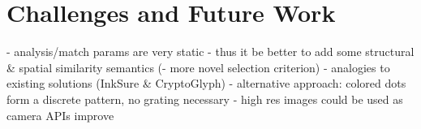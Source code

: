 \documentclass[thesis.tex]{subfiles}
\begin{document}
\section{Challenges and Future Work}
\begin{comment}

Ideally, the taggants would have been captured through a diffraction grating (or a prism). Translate to wavelengths through proper color calibration.

There are mainly two modules responsible for the color-rendering accuracy of a digital camera: the former is the illuminant estimation and correction module, and the latter is the color matrix transformation aimed to adapt the color response of the sensor to a standard color space. These two modules together form what may be called the color correction pipeline.

RGB is a device-dependent color model: different devices detect or reproduce a given RGB value differently, since the color elements (such as phosphors or dyes) and their response to the individual R, G, and B levels vary from manufacturer to manufacturer, or even in the same device over time. Thus an RGB value does not define the same color across devices without some kind of color management.
\url{http://www.cis.rit.edu/~jxj1770/publications/paperEI_Xerox.pdf}
\url{http://www.cs.unc.edu/techreports/04-012.pdf}


\end{comment}

- analysis/match params are very static
- thus it be better to add some structural \& spatial similarity semantics (- more novel selection criterion) - analogies to existing solutions (InkSure \& CryptoGlyph)
  - alternative approach: colored dots form a discrete pattern, no grating necessary
- high res images could be used as camera APIs improve
\end{document}
